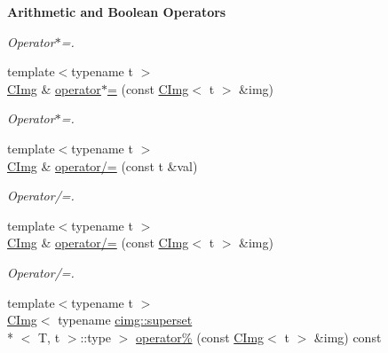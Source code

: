 \begin{Indent}{\bf Arithmetic and Boolean Operators}
\begin{DoxyCompactItemize}
\begin{DoxyCompactList}\small\item\em Operator$\ast$=. \end{DoxyCompactList}\item 
\hypertarget{structcimg__library_1_1_c_img_af323e3efbfd8a2da566b380aa34344b6}{{\footnotesize template$<$typename t $>$ }\\\hyperlink{structcimg__library_1_1_c_img}{C\-Img} \& \hyperlink{structcimg__library_1_1_c_img_af323e3efbfd8a2da566b380aa34344b6}{operator$\ast$=} (const \hyperlink{structcimg__library_1_1_c_img}{C\-Img}$<$ t $>$ \&img)}\label{structcimg__library_1_1_c_img_af323e3efbfd8a2da566b380aa34344b6}

\begin{DoxyCompactList}\small\item\em Operator$\ast$=. \end{DoxyCompactList}\item 
\hypertarget{structcimg__library_1_1_c_img_a863e39c0acb61107e0534b67245a1807}{{\footnotesize template$<$typename t $>$ }\\\hyperlink{structcimg__library_1_1_c_img}{C\-Img} \& \hyperlink{structcimg__library_1_1_c_img_a863e39c0acb61107e0534b67245a1807}{operator/=} (const t \&val)}\label{structcimg__library_1_1_c_img_a863e39c0acb61107e0534b67245a1807}

\begin{DoxyCompactList}\small\item\em Operator/=. \end{DoxyCompactList}\item 
\hypertarget{structcimg__library_1_1_c_img_a2fdcd03fe442d0ec209851f8e8a2e454}{{\footnotesize template$<$typename t $>$ }\\\hyperlink{structcimg__library_1_1_c_img}{C\-Img} \& \hyperlink{structcimg__library_1_1_c_img_a2fdcd03fe442d0ec209851f8e8a2e454}{operator/=} (const \hyperlink{structcimg__library_1_1_c_img}{C\-Img}$<$ t $>$ \&img)}\label{structcimg__library_1_1_c_img_a2fdcd03fe442d0ec209851f8e8a2e454}

\begin{DoxyCompactList}\small\item\em Operator/=. \end{DoxyCompactList}\item 
\hypertarget{structcimg__library_1_1_c_img_ad49d52873b3741dbc45eb16011b06ace}{{\footnotesize template$<$typename t $>$ }\\\hyperlink{structcimg__library_1_1_c_img}{C\-Img}$<$ typename \hyperlink{structcimg__library_1_1cimg_1_1superset}{cimg\-::superset}\\*
$<$ T, t $>$\-::type $>$ \hyperlink{structcimg__library_1_1_c_img_ad49d52873b3741dbc45eb16011b06ace}{operator\%} (const \hyperlink{structcimg__library_1_1_c_img}{C\-Img}$<$ t $>$ \&img) const }\label{structcimg__library_1_1_c_img_ad49d52873b3741dbc45eb16011b06ace}


\end{DoxyCompactItemize}
\end{Indent}
